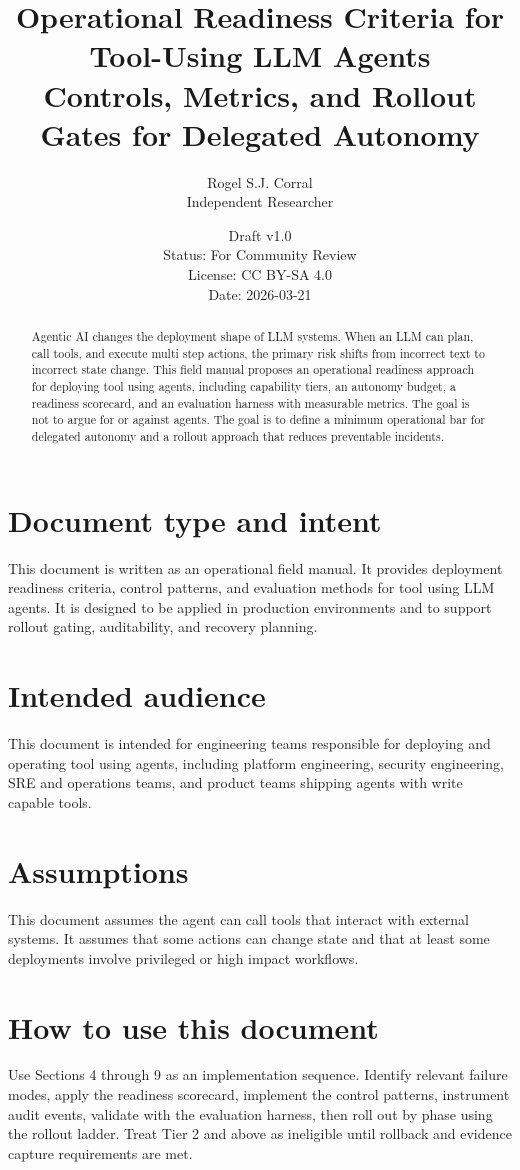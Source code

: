 \documentclass[11pt]{article}
\title{Operational Readiness Criteria for Tool-Using LLM Agents\\
\large Controls, Metrics, and Rollout Gates for Delegated Autonomy}
\author{Rogel S.J. Corral\\Independent Researcher}
\date{Draft v1.0\\Status: For Community Review\\License: CC BY-SA 4.0\\Date: 2026-03-21}
\begin{document}
\maketitle

\begin{abstract}
Agentic AI changes the deployment shape of LLM systems. When an LLM can plan, call tools, and execute multi step actions, the primary risk shifts from incorrect text to incorrect state change. This field manual proposes an operational readiness approach for deploying tool using agents, including capability tiers, an autonomy budget, a readiness scorecard, and an evaluation harness with measurable metrics. The goal is not to argue for or against agents. The goal is to define a minimum operational bar for delegated autonomy and a rollout approach that reduces preventable incidents.
\end{abstract}

\section*{Document type and intent}
This document is written as an operational field manual. It provides deployment readiness criteria, control patterns, and evaluation methods for tool using LLM agents. It is designed to be applied in production environments and to support rollout gating, auditability, and recovery planning.

\section*{Intended audience}
This document is intended for engineering teams responsible for deploying and operating tool using agents, including platform engineering, security engineering, SRE and operations teams, and product teams shipping agents with write capable tools.

\section*{Assumptions}
This document assumes the agent can call tools that interact with external systems. It assumes that some actions can change state and that at least some deployments involve privileged or high impact workflows.

\section*{How to use this document}
Use Sections 4 through 9 as an implementation sequence. Identify relevant failure modes, apply the readiness scorecard, implement the control patterns, instrument audit events, validate with the evaluation harness, then roll out by phase using the rollout ladder. Treat Tier 2 and above as ineligible until rollback and evidence capture requirements are met.
\end{document}
